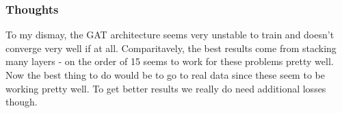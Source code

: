 \documentclass[a4paper]{article}
\begin{document}

\subsubsection*{Thoughts}
To my dismay, the GAT architecture seems very unstable to train and doesn't converge very well if at all. Comparitavely, the best results come from stacking many layers - on the order of 15 seems to work for these problems pretty well. Now the best thing to do would be to go to real data since these seem to be working pretty well. To get better results we really do need additional losses though.
\end{document}

